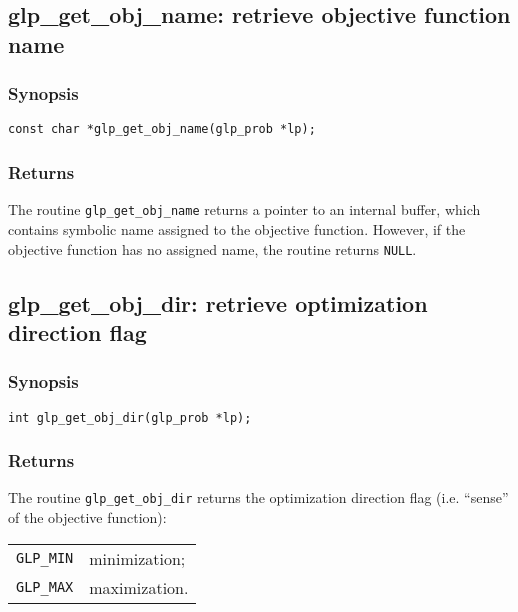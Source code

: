 \subsection{glp\_get\_obj\_name: retrieve objective function name}

\subsubsection*{Synopsis}

\begin{verbatim}
const char *glp_get_obj_name(glp_prob *lp);
\end{verbatim}

\subsubsection*{Returns}

The routine \verb|glp_get_obj_name| returns a pointer to an internal
buffer, which contains symbolic name assigned to the objective
function. However, if the objective function has no assigned name, the
routine returns \verb|NULL|.

\subsection{glp\_get\_obj\_dir: retrieve optimization direction flag}

\subsubsection*{Synopsis}

\begin{verbatim}
int glp_get_obj_dir(glp_prob *lp);
\end{verbatim}

\subsubsection*{Returns}

The routine \verb|glp_get_obj_dir| returns the optimization direction
flag (i.e. ``sense'' of the objective function):

\begin{tabular}{@{}ll}
\verb|GLP_MIN| & minimization; \\
\verb|GLP_MAX| & maximization. \\
\end{tabular}

\pagebreak

